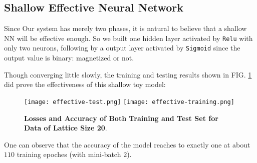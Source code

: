 \documentclass[prl,aps,twocolumn]{revtex4}
\begin{document}
	\subsection{Shallow Effective Neural Network}
		Since Our system has merely two phases, it is natural to believe that a shallow NN will be effective enough. So we built one hidden layer activated by \texttt{Relu} with only two neurons, following by a output layer activated by \texttt{Sigmoid} since the output value is binary: magnetized or not.\par
		Though converging little slowly, the training and testing results shown in FIG. \ref{fig:2.1} did prove the effectiveness of this shallow toy model:
		\begin{figure}[!htp]
			\texttt{[image: effective-test.png]}
			\texttt{[image: effective-training.png]}
			\caption{{\bf Losses and Accuracy of Both Training and Test Set for Data of Lattice Size 20}.}
			\label{fig:2.1}
		\end{figure}
		One can observe that the accuracy of the model reaches to exactly one at about $110$ training epoches (with mini-batch $2$).
\end{document}
